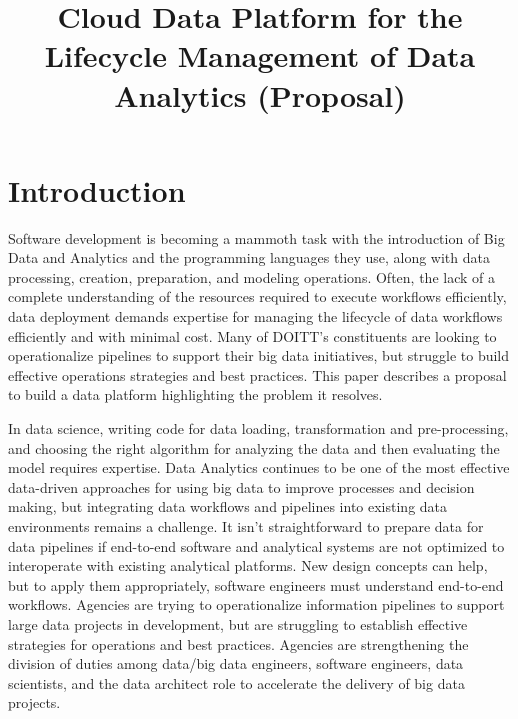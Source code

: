 \documentclass[conference]{IEEEtran}
\begin{document}
%
\title{Cloud Data Platform for the Lifecycle Management of Data Analytics (Proposal)}


\author{
	\and

}

\maketitle{}


\section{Introduction}
Software development is becoming a mammoth task with the introduction of Big Data and Analytics and the programming languages they use, along with data processing, creation, preparation, and modeling operations. Often, the lack of a complete understanding of the resources required to execute workflows efficiently, data deployment demands expertise for managing the lifecycle of data workflows efficiently and with minimal cost.  Many of DOITT's constituents are looking to operationalize pipelines to support their big data initiatives, but struggle to build effective operations strategies and best practices.  This paper describes a proposal to build a data platform highlighting the problem it resolves.

In data science, writing code for data loading, transformation and pre-processing, and choosing the right algorithm for analyzing the data and then evaluating the model requires expertise.  Data Analytics continues to be one of the most effective data-driven approaches for using big data to improve processes and decision making, but integrating data workflows and pipelines into existing data environments remains a challenge. It isn't straightforward to prepare data for data pipelines if end-to-end software and analytical systems are not optimized to interoperate with existing analytical platforms. New design concepts can help, but to apply them appropriately, software engineers must understand end-to-end workflows.  Agencies are trying to operationalize information pipelines to support large data projects in development, but are struggling to establish effective strategies for operations and best practices.  Agencies are strengthening the division of duties among data/big data engineers, software engineers, data scientists, and the data architect role to accelerate the delivery of big data projects. 
\end{document}
